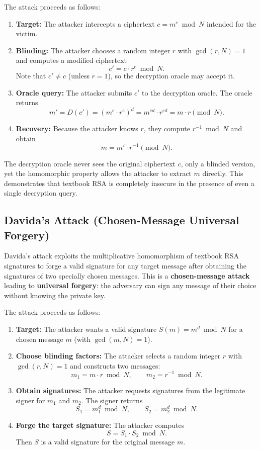 The attack proceeds as follows:

\begin{enumerate}
\item \textbf{Target:} The attacker intercepts a ciphertext \(c = m^e \bmod N\) intended for the victim.
\item \textbf{Blinding:} The attacker chooses a random integer \(r\) with \(\gcd(r,N)=1\) and computes a modified ciphertext
\[
c' = c \cdot r^e \bmod N.
\]
Note that \(c' \neq c\) (unless \(r=1\)), so the decryption oracle may accept it.
\item \textbf{Oracle query:} The attacker submits \(c'\) to the decryption oracle. The oracle returns
\[
m' = D(c') = (m^e \cdot r^e)^d = m^{ed} \cdot r^{ed} = m \cdot r \pmod{N}.
\]
\item \textbf{Recovery:} Because the attacker knows \(r\), they compute \(r^{-1} \bmod N\) and obtain
\[
m = m' \cdot r^{-1} \pmod{N}.
\]
\end{enumerate}

The decryption oracle never sees the original ciphertext \(c\), only a blinded version, yet the homomorphic property allows the attacker to extract \(m\) directly. This demonstrates that textbook RSA is completely insecure in the presence of even a single decryption query.

\subsection{Davida's Attack (Chosen-Message Universal Forgery)}

Davida's attack exploits the multiplicative homomorphism of textbook RSA signatures to forge a valid signature for any target message after obtaining the signatures of two specially chosen messages. This is a \textbf{chosen-message attack} leading to \textbf{universal forgery}: the adversary can sign any message of their choice without knowing the private key.

The attack proceeds as follows:

\begin{enumerate}
\item \textbf{Target:} The attacker wants a valid signature \(S(m) = m^d \bmod N\) for a chosen message \(m\) (with \(\gcd(m,N)=1\)).
\item \textbf{Choose blinding factors:} The attacker selects a random integer \(r\) with \(\gcd(r,N)=1\) and constructs two messages:
\[
m_1 = m \cdot r \bmod N, \qquad m_2 = r^{-1} \bmod N.
\]
\item \textbf{Obtain signatures:} The attacker requests signatures from the legitimate signer for \(m_1\) and \(m_2\). The signer returns
\[
S_1 = m_1^d \bmod N, \qquad S_2 = m_2^d \bmod N.
\]
\item \textbf{Forge the target signature:} The attacker computes
\[
S = S_1 \cdot S_2 \bmod N.
\]
Then \(S\) is a valid signature for the original message \(m\).
\end{enumerate}

